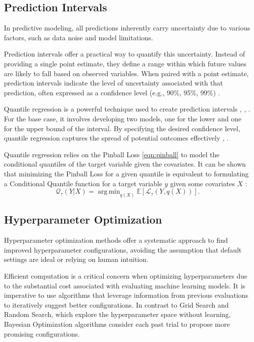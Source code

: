\documentclass{IEEEtran}
\DeclareMathOperator*{\argmin}{arg\,min}
\begin{document}
        \subsection{Prediction Intervals} \label{sec:prediction_intervals}

            In predictive modeling, all predictions inherently carry uncertainty due to various factors, such as data noise and model limitations.

            Prediction intervals offer a practical way to quantify this uncertainty. Instead of providing a single point estimate, they define a range within which future values are likely to fall based on observed variables. When paired with a point estimate, prediction intervals indicate the level of uncertainty associated with that prediction, often expressed as a confidence level (e.g., 90\%, 95\%, 99\%) \cite{barron2022probability}.

            Quantile regression is a powerful technique used to create prediction intervals \cite{pi-stock}, \cite{pi-wind-power}, \cite{pi-dl-rul}. For the base case, it involves developing two models, one for the lower and one for the upper bound of the interval. By specifying the desired confidence level, quantile regression captures the spread of potential outcomes effectively \cite{romano2019conformalized}, \cite{pi-motivation}.

            Quantile regression relies on the Pinball Loss \eqref{eqn:pinball} to model the conditional quantiles of the target variable given the covariates. It can be shown that minimizing the Pinball Loss for a given quantile is equivalent to formulating a Conditional Quantile function for a target variable $y$ given some covariates $X$ \cite{koenker2001quantile}:
            \begin{equation}
                \mathcal{Q}_\tau(Y | X) = \argmin_{q(X)} \mathbb{E}[\mathcal{L}_\tau(Y, q(X))].
            \end{equation}

        \subsection{Hyperparameter Optimization} \label{sec:hyperparameter}

            Hyperparameter optimization methods offer a systematic approach to find improved hyperparameter configurations, avoiding the assumption that default settings are ideal or relying on human intuition.

            Efficient computation is a critical concern when optimizing hyperparameters due to the substantial cost associated with evaluating machine learning models. It is imperative to use algorithms that leverage information from previous evaluations to iteratively suggest better configurations. In contrast to Grid Search and Random Search, which explore the hyperparameter space without learning, Bayesian Optimization algorithms consider each past trial to propose more promising configurations.
\end{document}
